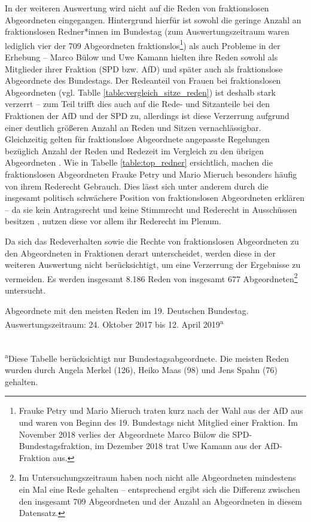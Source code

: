 \documentclass[12pt, 
    twoside=false, 
    bibliography=totoc, 
    numbers=endperiod, 
    headings=normal, 
    toc=chapterentrydotfill
    ]{scrbook}
\begin{document}
In der weiteren Auswertung wird nicht auf die Reden von fraktionslosen Abgeordneten eingegangen. Hintergrund hierfür ist sowohl die geringe Anzahl an fraktionslosen Redner*innen im Bundestag (zum Auswertungszeitraum waren lediglich vier der 709 Abgeordneten fraktionslos\footnote{Frauke Petry und Mario Mieruch traten kurz nach der Wahl aus der AfD aus und waren von Beginn des 19. Bundestags nicht Mitglied einer Fraktion. Im November 2018 verlies der Abgeordnete Marco Bülow die SPD-Bundestagsfraktion, im Dezember 2018 trat Uwe Kamann aus der AfD-Fraktion aus.}) als auch Probleme in der Erhebung -- Marco Bülow und Uwe Kamann hielten ihre Reden sowohl als Mitglieder ihrer Fraktion (SPD bzw. AfD) und später auch als fraktionslose Abgeordnete des Bundestags. Der Redeanteil von Frauen bei fraktionslosen Abgeordneten (vgl. Tablle \ref{table:vergleich_sitze_reden}) ist deshalb stark verzerrt -- zum Teil trifft dies auch auf die Rede- und Sitzanteile bei den Fraktionen der AfD und der SPD zu, allerdings ist diese Verzerrung aufgrund einer deutlich größeren Anzahl an Reden und Sitzen vernachlässigbar.
Gleichzeitig gelten für fraktionslose Abgeordnete angepasste Regelungen bezüglich Anzahl der Reden und Redezeit im Vergleich zu den übrigen Abgeordneten \parencite[vgl.][583f.]{schreiner_2005}. Wie in Tabelle \ref{table:top_redner} ersichtlich, machen die fraktionslosen Abgeordneten Frauke Petry und Mario Mieruch besonders häufig von ihrem Rederecht Gebrauch. Dies lässt sich unter anderem durch die insgesamt politisch schwächere Position von fraktionslosen Abgeordneten erklären \parencite[372]{morlok_2018} -- da sie kein Antragsrecht und keine Stimmrecht und Rederecht in Ausschüssen besitzen \parencite[vgl.][]{morlok_2018}, nutzen diese vor allem ihr Rederecht im Plenum.

Da sich das Redeverhalten sowie die Rechte von fraktionslosen Abgeordneten zu den Abgeordneten in Fraktionen derart unterscheidet, werden diese in der weiteren Auswertung nicht berücksichtigt, um eine Verzerrung der Ergebnisse zu vermeiden. Es werden insgesamt 8.186 Reden von insgesamt 677 Abgeordneten\footnote{Im Untersuchungszeitraum haben noch nicht alle Abgeordneten mindestens ein Mal eine Rede gehalten -- entsprechend ergibt sich die Differenz zwischen den insgesamt 709 Abgeordneten und der Anzahl an Abgeordneten in diesem Datensatz.} untersucht. 

\begin{table}[htb]
    \centering
    \caption[Abgeordnete mit den meisten Reden im 19. Deutschen Bundestag.]{Abgeordnete mit den meisten Reden im 19. Deutschen Bundestag. Auswertungszeitraum: 24. Oktober 2017 bis 12. April 2019\textsuperscript{a}}
     \\
    \small\textsuperscript{a}Diese Tabelle berücksichtigt nur Bundestagsabgeordnete. Die meisten Reden wurden durch Angela Merkel (126), Heiko Maas (98) und Jens Spahn (76) gehalten.
    \label{table:top_redner}
\end{table}
\end{document}
